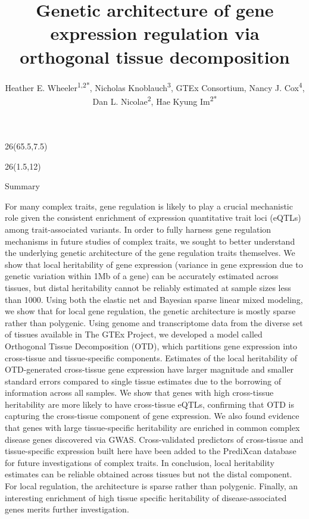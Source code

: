 \documentclass[final]{beamer}
\title{Genetic architecture of gene expression regulation via orthogonal tissue decomposition}
\author{Heather E. Wheeler\textsuperscript{1,2*}, Nicholas Knoblauch\textsuperscript{3},  GTEx Consortium, Nancy J. Cox\textsuperscript{4}, Dan L. Nicolae\textsuperscript{2}, Hae Kyung Im\textsuperscript{2*}}
\institute{\small{\textsuperscript{1}Departments of Biology and Computer Science, Loyola University Chicago; \textsuperscript{2}Department of Medicine, University of Chicago, Chicago, IL;\\\textsuperscript{3}Committee on Genetics, Genomics, and Systems Biology, University of Chicago; \textsuperscript{4}Division of Genetic Medicine, Vanderbilt University}}
\date{}
\newcommand{\VcoordTop}{12}
\newcommand{\HcoordFirst}{1.5}
\newcommand{\ColWidth}{26}
\begin{document}
\begin{frame}{} 

% 
\begin{textblock}{\ColWidth}(65.5,7.5)%
\end{textblock}



%
%

\begin{textblock}{\ColWidth}(\HcoordFirst,\VcoordTop)

\begin{block}{Summary}
\begin{footnotesize}

For many complex traits, gene regulation is likely to play a crucial mechanistic role given the consistent enrichment of expression quantitative trait loci (eQTLs) among trait-associated variants. In order to fully harness gene regulation mechanisms in future studies of complex traits, we sought to better understand the underlying genetic architecture of the gene regulation traits themselves. We show that local heritability of gene expression (variance in gene expression due to genetic variation within 1Mb of a gene) can be accurately estimated across tissues, but distal heritability cannot be reliably estimated at sample sizes less than 1000. Using both the elastic net and Bayesian sparse linear mixed modeling, we show that for local gene regulation, the genetic architecture is mostly sparse rather than polygenic. Using genome and transcriptome data from the diverse set of tissues available in The GTEx Project, we developed a model called Orthogonal Tissue Decomposition (OTD), which partitions gene expression into cross-tissue and tissue-specific components. Estimates of the local heritability of OTD-generated cross-tissue gene expression have larger magnitude and smaller standard errors compared to single tissue estimates due to the borrowing of information across all samples. We show that genes with high cross-tissue heritability are more likely to have cross-tissue eQTLs, confirming that OTD is capturing the cross-tissue component of gene expression. We also found evidence that genes with large tissue-specific heritability are enriched in common complex disease genes discovered via GWAS. Cross-validated predictors of cross-tissue and tissue-specific expression built here have been added to the PrediXcan database for future investigations of complex traits. In conclusion, local heritability estimates can be reliable obtained across tissues but not the distal component. For local regulation, the architecture is sparse rather than polygenic. Finally, an interesting enrichment of high tissue specific heritability of disease-associated genes merits further investigation.


\end{footnotesize}
\end{block}
\end{textblock}
\end{frame}
\end{document}
